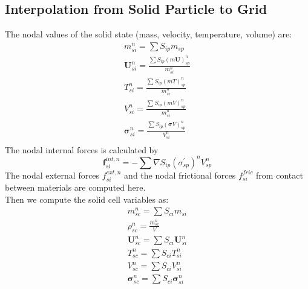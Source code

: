 \documentclass[preprint,12pt]{elsarticle}
\begin{document}
\subsection{\textsf{Interpolation from Solid Particle to Grid}}
%
%
The nodal values of the solid state (mass, velocity, temperature, volume) are:
%
%
\begin{equation}
\begin{gathered}
     m_{si}^n = \sum{S_{ip}m_{sp}}\\
     \pmb{U}_{si}^n = \frac {\sum{S_{ip} (m\pmb{U})_{sp}^n}}{m_{si}^n}\\
     T_{si}^n = \frac {\sum{S_{ip} (mT)_{sp}^n}}{m_{si}^n}\\
     V_{si}^n = \frac {\sum{S_{ip} (mV)_{sp}^n}}{m_{si}^n}\\
     \pmb{\sigma}_{si}^n = \frac {\sum{S_{ip} (\pmb{\sigma}V)_{sp}^n}}{V_{si}^n}\\
\end {gathered}
\end {equation}
%
%
The nodal internal forces is calculated by
%
%
\begin{equation}
     \pmb{f}_{si}^{int,n} = -\sum{\nabla S_{ip} (\sigma_{sp}^\prime)^n V_{sp}^n}
\end {equation}
%
%
The nodal external forces $f_{si}^{ext,n}$ and the nodal frictional forces $f_{si}^{fric}$ from contact between materials are computed here.\\
Then we compute the solid cell variables as:
%
%
\begin{equation}
\begin{gathered}
     m_{sc}^n = \sum{S_{ci}m_{si}}\\
   \rho_{sc}^n = \frac{m_{sc}^n}{V}\\  
     \pmb{U}_{sc}^n = \sum{S_{ci} \pmb{U}_{si}^n}\\
     T_{sc}^n = \sum{S_{ci} T_{si}^n}\\
     V_{sc}^n = \sum{S_{ci} V_{si}^n}\\
     \pmb{\sigma}_{sc}^n = \sum{S_{ci} \pmb{\sigma}_{si}^n}\\
\end {gathered}
\end {equation}
%
%
\end{document}
